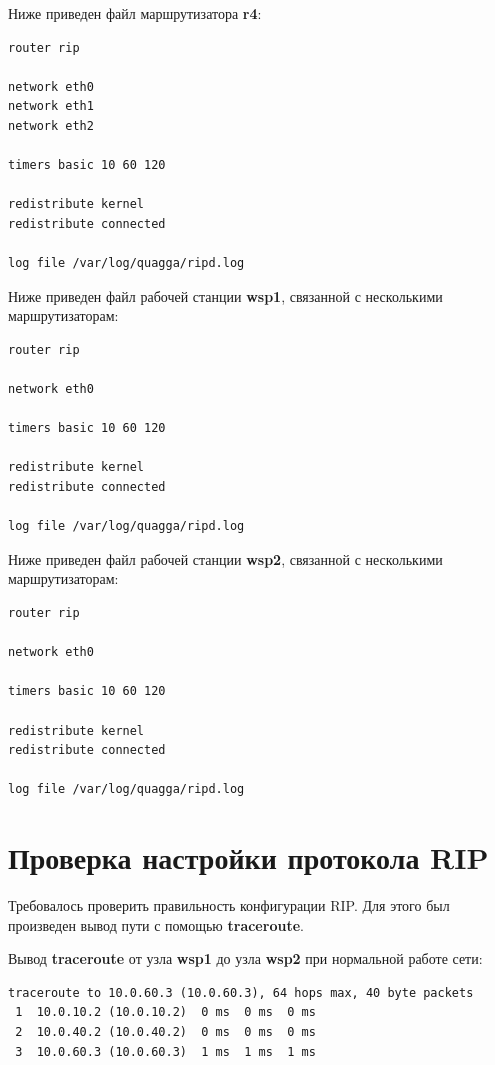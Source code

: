 \documentclass[a4paper,12pt]{article}
\begin{document}
Ниже приведен файл  маршрутизатора \textbf{r4}:

\begin{Verbatim}
router rip

network eth0
network eth1
network eth2

timers basic 10 60 120

redistribute kernel
redistribute connected

log file /var/log/quagga/ripd.log
\end{Verbatim}

Ниже приведен файл  рабочей станции \textbf{wsp1}, связанной с несколькими маршрутизаторам:

\begin{Verbatim}
router rip

network eth0

timers basic 10 60 120

redistribute kernel
redistribute connected

log file /var/log/quagga/ripd.log
\end{Verbatim}

Ниже приведен файл  рабочей станции \textbf{wsp2}, связанной с несколькими маршрутизаторам:

\begin{Verbatim}
router rip

network eth0

timers basic 10 60 120

redistribute kernel
redistribute connected

log file /var/log/quagga/ripd.log
\end{Verbatim}


\section{Проверка настройки протокола RIP}

Требовалось проверить правильность конфигурации RIP. Для этого был произведен вывод пути с помощью \textbf{traceroute}.

Вывод \textbf{traceroute} от узла \textbf{wsp1} до узла \textbf{wsp2} при нормальной работе сети:

\begin{Verbatim}
traceroute to 10.0.60.3 (10.0.60.3), 64 hops max, 40 byte packets
 1  10.0.10.2 (10.0.10.2)  0 ms  0 ms  0 ms
 2  10.0.40.2 (10.0.40.2)  0 ms  0 ms  0 ms
 3  10.0.60.3 (10.0.60.3)  1 ms  1 ms  1 ms
\end{Verbatim}
\end{document}
